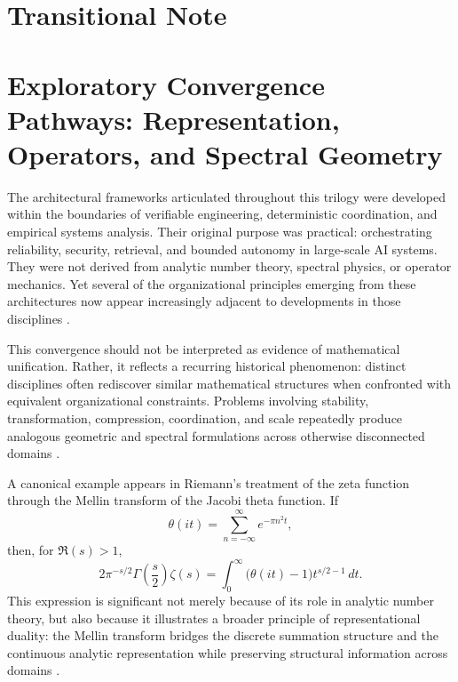 \clearpage
{}
\appendix
\chapter{Transitional Note}
\label{ch:appendix_exploring}

\chapter{Exploratory Convergence Pathways: Representation, Operators, and Spectral Geometry}
\label{app:exploratory_pathways}

The architectural frameworks articulated throughout this trilogy were developed within the boundaries of verifiable engineering, deterministic coordination, and empirical systems analysis. Their original purpose was practical: orchestrating reliability, security, retrieval, and bounded autonomy in large-scale AI systems. They were not derived from analytic number theory, spectral physics, or operator mechanics. Yet several of the organizational principles emerging from these architectures now appear increasingly adjacent to developments in those disciplines \cite{irwin2026mlf}.

This convergence should not be interpreted as evidence of mathematical unification. Rather, it reflects a recurring historical phenomenon: distinct disciplines often rediscover similar mathematical structures when confronted with equivalent organizational constraints. Problems involving stability, transformation, compression, coordination, and scale repeatedly produce analogous geometric and spectral formulations across otherwise disconnected domains \cite{bracewell2000fourier,titchmarsh1986theory}.

A canonical example appears in Riemann's treatment of the zeta function through the Mellin transform of the Jacobi theta function. If
\[
\theta(it)=\sum_{n=-\infty}^{\infty} e^{-\pi n^2 t},
\]
then, for \(\Re(s)>1\),
\[
2\pi^{-s/2}\Gamma\left(\frac{s}{2}\right)\zeta(s)
=
\int_{0}^{\infty}\bigl(\theta(it)-1\bigr)t^{s/2-1}\,dt.
\]
This expression is significant not merely because of its role in analytic number theory, but also because it illustrates a broader principle of representational duality: the Mellin transform bridges the discrete summation structure and the continuous analytic representation while preserving structural information across domains \cite{edwards1974riemann}.

